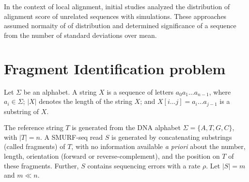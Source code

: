 In the context of local alignment, initial studies \cite{} analyzed the
distribution of alignment score of unrelated sequences with simulations.
These approaches assumed normaity of of distribution and determined
significance of a sequence from the number of standard deviations over
mean.














\section{Fragment Identification problem}
Let $\Sigma$ be an alphabet. A string $X$ is a sequence of letters $a_0
a_1 \dots a_{n-1}$, where $a_i \in \Sigma$; $|X|$ denotes the length of
the string $X$; and $X[i \dots j] = a_i \dots a_{j-1}$ is a substring of
$X$.

The reference string $T$ is generated from the DNA alphabet $\Sigma =
\{A, T, G, C\}$, with $|T| = n$.
A SMURF-seq read $S$ is generated by concatenating substrings (called
fragments) of $T$, with no information available \textit{a priori} about
the number, length, orientation (forward or reverse-complement), and the
position on $T$ of these fragments.  Further, $S$ contains sequencing
errors with a rate $\rho$. Let $|S| = m$ and $m \ll n$.

